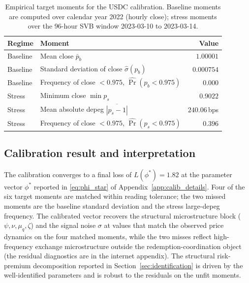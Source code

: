 \begin{table}[H]
\centering
\caption{Empirical target moments for the USDC calibration. Baseline moments are computed over calendar year 2022 (hourly close); stress moments over the 96-hour SVB window 2023-03-10 to 2023-03-14.}\label{tab:moments_targets}
\begin{tabular}{llr}
\toprule
Regime & Moment & Value \\
\midrule
Baseline & Mean close $\bar p_b$                                 & $1.00001$       \\
Baseline & Standard deviation of close $\hat\sigma(p_b)$          & $0.000754$      \\
Baseline & Frequency of close $< 0.975$, $\widehat{\Pr}(p_b<0.975)$ & $0.000$       \\
\midrule
Stress   & Minimum close $\min p_s$                              & $0.9022$        \\
Stress   & Mean absolute depeg $\overline{|p_s-1|}$               & $240.06$\,bps   \\
Stress   & Frequency of close $< 0.975$, $\widehat{\Pr}(p_s<0.975)$ & $0.396$       \\
\bottomrule
\end{tabular}
\end{table}

\subsection{Calibration result and interpretation}\label{sub:interp}

The calibration converges to a final loss of $L(\phi^*) = 1.82$ at the parameter vector $\phi^*$ reported in \eqref{eq:phi_star} of Appendix~\ref{app:calib_details}. Four of the six target moments are matched within reading tolerance; the two missed moments are the baseline standard deviation and the stress large-depeg frequency. The calibrated vector recovers the structural microstructure block ($\psi, \nu, \mu_q, \zeta$) and the signal noise $\sigma$ at values that match the observed price dynamics on the four matched moments, while the two misses reflect high-frequency exchange microstructure outside the redemption-coordination object (the residual diagnostics are in the internet appendix). The structural risk-premium decomposition reported in Section~\ref{sec:identification} is driven by the well-identified parameters and is robust to the residuals on the unfit moments.
